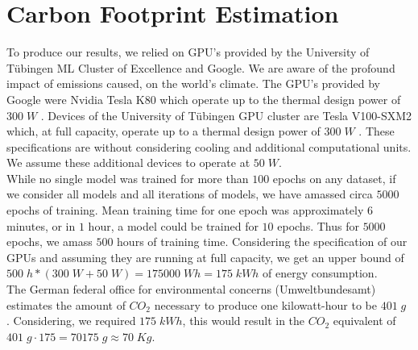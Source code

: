 \documentclass[a4paper,cleardoubleempty,BCOR1cm, 11pt]{report}
\begin{document}
\section{Carbon Footprint Estimation}
To produce our results, we relied on GPU's provided by the University of Tübingen ML Cluster of Excellence and Google. We are aware of the profound impact of emissions caused, on the world's climate.
The GPU's provided by Google were Nvidia Tesla K80 which operate up to the thermal design power of $300\;W$ \cite{nvidia2015tesla}. Devices of the University of Tübingen GPU cluster are Tesla V100-SXM2 which, at full capacity, operate up to a thermal design power of $300\;W$ \cite{nvidia2017tesla}. These specifications are without considering cooling and additional computational units. We assume these additional devices to operate at $50\;W$.\\
While no single model was trained for more than $100$ epochs on any dataset, if we consider all models and all iterations of models, we have amassed circa $5000$ epochs of training. Mean training time for one epoch was approximately $6$ minutes, or in $1$ hour, a model could be trained for $10$ epochs. Thus for $5000$ epochs, we amass $500$ hours of training time. Considering the specification of our GPUs and assuming they are running at full capacity, we get an upper bound of $500\;h * (300\;W + 50\;W) = 175000\;Wh=175\;kWh$ of energy consumption.\\
The German federal office for environmental concerns (Umweltbundesamt) estimates the amount of $CO_2$ necessary to produce one kilowatt-hour to be $401\;g$ \cite{icha2016entwicklung}. Considering, we required $175\;kWh$, this would result in the $CO_2$ equivalent of $401\;g \cdot 175 = 70175\;g \approx 70\;Kg$.

\end{document}
